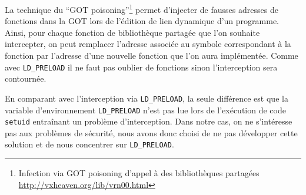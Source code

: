 La technique du ``GOT poisoning''\footnote{Infection via GOT poisoning d'appel à des bibliothèques partagées \\ \url{http://vxheaven.org/lib/vrn00.html}} permet d'injecter de fausses adresses de fonctions dans la GOT lors de l'édition de lien dynamique d'un programme. Ainsi, pour chaque fonction de bibliothèque partagée que l'on souhaite intercepter, on peut remplacer l'adresse associée au symbole correspondant à la fonction par l'adresse d'une nouvelle fonction que l'on aura implémentée. Comme avec \texttt{LD\_PRELOAD} il ne faut pas oublier de fonctions sinon l'interception sera contournée.

En comparant avec l'interception via \texttt{LD\_PRELOAD}, la seule différence est que la variable d'environnement \texttt{LD\_PRELOAD} n'est pas lue lors de l'exécution de code \texttt{setuid} entraînant un problème d'interception. Dans notre cas, on ne s'intéresse pas aux problèmes de sécurité, nous avons donc choisi de ne pas développer cette solution et de nous concentrer sur \texttt{LD\_PRELOAD}.

\vspace{0.5cm}
